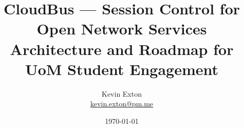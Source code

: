 \title{CloudBus --- Session Control for Open Network Services\\
	\vspace{1em}
\normalsize Architecture and Roadmap for UoM Student Engagement}
\author[K. Exton]{
	\centering
	Kevin Exton\\
	\href{mailto:kevin.exton@pm.me}{\footnotesize kevin.exton@pm.me}
}
\date{\today}
\begin{frame}[plain]
	\titlepage
	\centering
\end{frame}